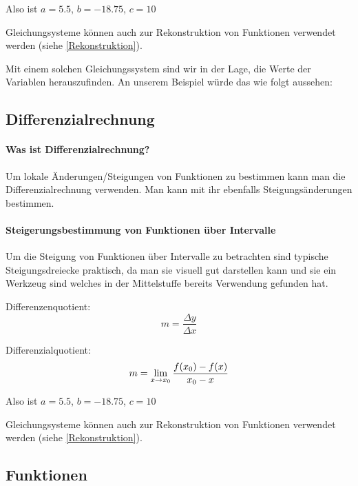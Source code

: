\documentclass{article}
\begin{document}
			Also ist $a=5.5$, $b=-18.75$, $c=10$
			
			Gleichungsysteme können auch zur Rekonstruktion von Funktionen verwendet werden (siehe \ref{Rekonstruktion}). 

			Mit einem solchen Gleichungssystem sind wir in der Lage, die Werte der Variablen herauszufinden. An unserem Beispiel würde das wie folgt aussehen:


	\subsection{Differenzialrechnung}
		\paragraph{Was ist Differenzialrechnung?}
			Um lokale Änderungen/Steigungen von Funktionen zu bestimmen kann man die Differenzialrechnung verwenden.
			Man kann mit ihr ebenfalls Steigungsänderungen bestimmen.
		\paragraph{Steigerungsbestimmung von Funktionen über Intervalle}

			Um die Steigung von Funktionen über Intervalle zu betrachten sind typische Steigungsdreiecke praktisch,
			da man sie visuell gut darstellen kann und sie ein Werkzeug sind welches in der Mittelstuffe bereits
			Verwendung gefunden hat.
			 
			Differenzenquotient:
			\[
			    m = {\frac {\Delta y} {\Delta x}}
			\]
			
			Differenzialquotient:
			\[
			    m = \lim_{x \to x_{0}} {{f(x_{0}) - f(x)} \over { x_{0} - x}}
			\]

			Also ist $a=5.5$, $b=-18.75$, $c=10$

			Gleichungsysteme können auch zur Rekonstruktion von Funktionen verwendet werden (siehe \ref{Rekonstruktion}). 

	\subsection{Funktionen}
\end{document}
